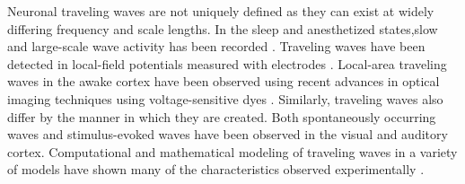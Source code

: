 Neuronal traveling waves are not uniquely defined as they can exist at widely differing frequency and scale lengths.  
In the sleep and anesthetized states,slow and large-scale wave activity has been recorded \citep{Muller2018}. 
Traveling waves have been detected in local-field potentials measured with electrodes \citep{Rubino2006}\citep{sanes1993}\citep{Riehle2013}.
Local-area traveling waves in the awake cortex have been observed using recent advances in optical imaging techniques using voltage-sensitive dyes \citep{wu2008}\citep{Shoham1999}\citep{Xu2007}\citep{Ferezou2006}.  
Similarly, traveling waves also differ by the manner in which they are created. 
Both spontaneously occurring waves and stimulus-evoked \citep{reimer2010} waves have been observed in the visual and auditory cortex. 
Computational and mathematical modeling of traveling waves in a variety of models have shown many of the characteristics observed experimentally \citep{ermentrout2001}\citep{keane2015}\citep{gibson2009}.



\endinput
